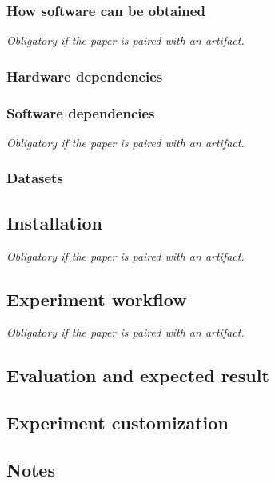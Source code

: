 \subsubsection{How software can be obtained }
{\em Obligatory if the paper is paired with an artifact.}

\subsubsection{Hardware dependencies}

\subsubsection{Software dependencies}
{\em Obligatory if the paper is paired with an artifact.}


\subsubsection{Datasets}

\subsection{Installation}

{\em Obligatory if the paper is paired with an artifact.}

\subsection{Experiment workflow}

{\em Obligatory if the paper is paired with an artifact.}

\subsection{Evaluation and expected result}


\subsection{Experiment customization}

\subsection{Notes}



